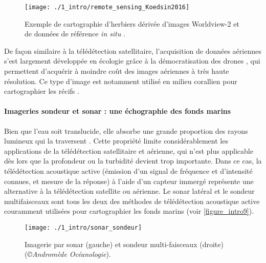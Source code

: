 \begin{figure}[H]
	\begin{center}
	\texttt{[image: ./1\_intro/remote\_sensing\_Koedsin2016]}
		\caption[Exemple de cartographie d’herbiers par télédétection]{Exemple de cartographie d’herbiers dérivée d’images Worldview-2 et de données de référence \textit{in situ} \citep{koedsin_integrated_2016}.}
	\label{figure_intro8}
\end{center}
\end{figure}

De façon similaire à la télédétection satellitaire, l’acquisition de données aériennes s’est largement développée en écologie grâce à la démocratisation des drones \citep{ivosevic_use_2015}, qui permettent d’acquérir à moindre coût des images aériennes à très haute résolution. Ce type d’image est notamment utilisé en milieu corallien pour cartographier les récifs \citep{casella_mapping_2017, collin_very_2018}. 

\paragraph{Imageries sondeur et sonar : une échographie des fonds marins}

Bien que l’eau soit translucide, elle absorbe une grande proportion des rayons lumineux qui la traversent \citep{wozniak_light_2007}. Cette propriété limite considérablement les applications de la télédétection satellitaire et aérienne, qui n’est plus applicable dès lors que la profondeur ou la turbidité devient trop importante. Dans ce cas, la télédétection acoustique active (émission d’un signal de fréquence et d’intensité connues, et mesure de la réponse) à l’aide d’un capteur immergé représente une alternative à la télédétection satellite ou aérienne. Le sonar latéral et le sondeur multifaisceaux sont tous les deux des méthodes de télédétection acoustique active couramment utilisées pour cartographier les fonds marins \citep{saxena_review_1999, brown_benthic_2011} (voir \autoref{figure_intro9}). 

\begin{figure}[H]
	\begin{center}
	\texttt{[image: ./1\_intro/sonar\_sondeur]}
		\caption[Imageries sonar et sondeur multi-faisceaux]{Imagerie par sonar (gauche) et sondeur multi-faisceaux (droite) (\textit{©Andromède Océanologie}).}
	\label{figure_intro9}
\end{center}
\end{figure}

